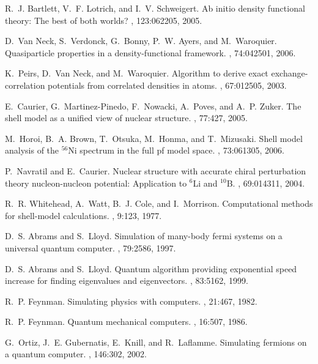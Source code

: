 \documentclass[aps,pra,twocolumn,floatfix]{revtex4}
\begin{document}
\begin{thebibliography}{100}
R.~J. Bartlett, V.~F. Lotrich, and I.~V. Schweigert.
\newblock Ab initio density functional theory: The best of both worlds?
, 123:062205, 2005.

D.~Van Neck, S.~Verdonck, G.~Bonny, P.~W. Ayers, and M.~Waroquier.
\newblock Quasiparticle properties in a density-functional framework.
,
  74:042501, 2006.

K.~Peirs, D.~Van Neck, and M.~Waroquier.
\newblock Algorithm to derive exact exchange-correlation potentials from
  correlated densities in atoms.
,
  67:012505, 2003.

E.~Caurier, G.~Martinez-Pinedo, F.~Nowacki, A.~Poves, and A.~P. Zuker.
\newblock The shell model as a unified view of nuclear structure.
, 77:427, 2005.

M.~Horoi, B.~A. Brown, T.~Otsuka, M.~Honma, and T.~Mizusaki.
\newblock Shell model analysis of the $^{56}$Ni spectrum in the full pf model
  space.
, 73:061305, 2006.

P.~Navratil and E.~Caurier.
\newblock Nuclear structure with accurate chiral perturbation theory
  nucleon-nucleon potential: Application to $^6$Li and $^{10}$B.
, 69:014311, 2004.

R.~R. Whitehead, A.~Watt, B.~J. Cole, and I.~Morrison.
\newblock Computational methods for shell-model calculations.
, 9:123, 1977.

D.~S. Abrams and S.~Lloyd.
\newblock Simulation of many-body fermi systems on a universal quantum
  computer.
, 79:2586, 1997.

D.~S. Abrams and S.~Lloyd.
\newblock Quantum algorithm providing exponential speed increase for finding
  eigenvalues and eigenvectors.
, 83:5162, 1999.

R.~P. Feynman.
\newblock Simulating physics with computers.
, 21:467, 1982.

R.~P. Feynman.
\newblock Quantum mechanical computers.
, 16:507, 1986.

G.~Ortiz, J.~E. Gubernatis, E.~Knill, and R.~Laflamme.
\newblock Simulating fermions on a quantum computer.
, 146:302, 2002.


\end{thebibliography}
\end{document}
